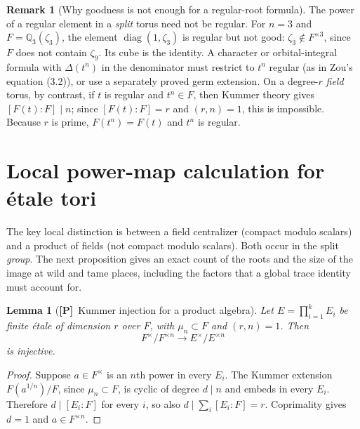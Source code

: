 \documentclass[11pt]{article}
\newcommand{\Ptag}{\textnormal{\textbf{[P]}}}
\theoremstyle{plain}
\newtheorem{lemma}[theorem]{Lemma}
\theoremstyle{definition}
\newtheorem{remark}[theorem]{Remark}
\begin{document}
\begin{remark}[Why goodness is not enough for a regular-root formula]\label{rem:power-singular}
The power of a regular element in a \emph{split} torus need not be
regular.  For $n=3$ and $F=\mathbb Q_3(\zeta_3)$, the element
$\operatorname{diag}(1,\zeta_3)$ is regular but not good:
$\zeta_3\notin F^{\times3}$, since $F$ does not contain $\zeta_9$.
Its cube is the identity.  A character or orbital-integral formula with
$\Delta(t^n)$ in the denominator must restrict to $t^n$ regular
(as in Zou's equation (3.2)), or use a separately proved germ extension.
On a degree-$r$ \emph{field} torus, by contrast, if $t$ is regular
and $t^n\in F$, then Kummer theory gives
$[F(t):F]\mid n$; since $[F(t):F]=r$ and $(r,n)=1$, this is
impossible.  Because $r$ is prime, $F(t^n)=F(t)$ and $t^n$ is regular.
\end{remark}

\section{Local power-map calculation for \texorpdfstring{\'etale}{etale} tori}\label{sec:localpowers}
The key local distinction is between a field centralizer (compact
modulo scalars) and a product of fields (not compact modulo scalars).
Both occur in the split \emph{group}.  The next proposition gives
an exact count of the roots and the size of the image at wild and
tame places, including the factors that a global trace identity
must account for.

\begin{lemma}[\Ptag\ Kummer injection for a product algebra]\label{lem:Kumprod}
Let $E=\prod_{i=1}^kE_i$ be finite \emph{\'etale} of dimension $r$
over $F$, with $\mu_n\subset F$ and $(r,n)=1$.  Then
\begin{equation}\label{eq:Kummerinj}
 F^\times/F^{\times n}\longrightarrow
 E^\times/E^{\times n}
\end{equation}
is injective.
\end{lemma}
\begin{proof}
Suppose $a\in F^\times$ is an $n$th power in every $E_i$.
The Kummer extension $F(a^{1/n})/F$, since $\mu_n\subset F$,
is cyclic of degree $d\mid n$ and embeds in every $E_i$.
Therefore $d\mid[E_i:F]$ for every $i$, so also
$d\mid\sum_i[E_i:F]=r$.  Coprimality gives $d=1$ and
$a\in F^{\times n}$.
\end{proof}
\end{document}
